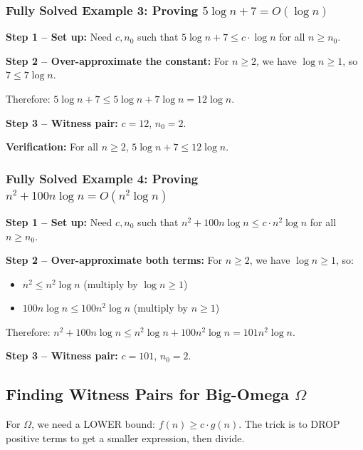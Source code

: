 \documentclass[12pt,portrait]{article}
\begin{document}
\subsubsection{Fully Solved Example 3: Proving $5\log n + 7 = O(\log n)$}

\begin{rulebox}
\textbf{Step 1 -- Set up:} Need $c, n_0$ such that $5\log n + 7 \leq c \cdot \log n$ for all $n \geq n_0$.

\textbf{Step 2 -- Over-approximate the constant:} For $n \geq 2$, we have $\log n \geq 1$, so $7 \leq 7\log n$.

Therefore: $5\log n + 7 \leq 5\log n + 7\log n = 12\log n$.

\textbf{Step 3 -- Witness pair:} $c = 12$, $n_0 = 2$.

\textbf{Verification:} For all $n \geq 2$, $5\log n + 7 \leq 12\log n$.
\end{rulebox}

\subsubsection{Fully Solved Example 4: Proving $n^2 + 100n\log n = O(n^2 \log n)$}

\begin{rulebox}
\textbf{Step 1 -- Set up:} Need $c, n_0$ such that $n^2 + 100n\log n \leq c \cdot n^2\log n$ for all $n \geq n_0$.

\textbf{Step 2 -- Over-approximate both terms:} For $n \geq 2$, we have $\log n \geq 1$, so:
\begin{itemize}[leftmargin=*]
    \item $n^2 \leq n^2\log n$ (multiply by $\log n \geq 1$)
    \item $100n\log n \leq 100n^2\log n$ (multiply by $n \geq 1$)
\end{itemize}
Therefore: $n^2 + 100n\log n \leq n^2\log n + 100n^2\log n = 101n^2\log n$.

\textbf{Step 3 -- Witness pair:} $c = 101$, $n_0 = 2$.
\end{rulebox}

\subsection{Finding Witness Pairs for Big-Omega $\Omega$}

For $\Omega$, we need a LOWER bound: $f(n) \geq c \cdot g(n)$. The trick is to DROP positive terms to get a smaller expression, then divide.
\end{document}
